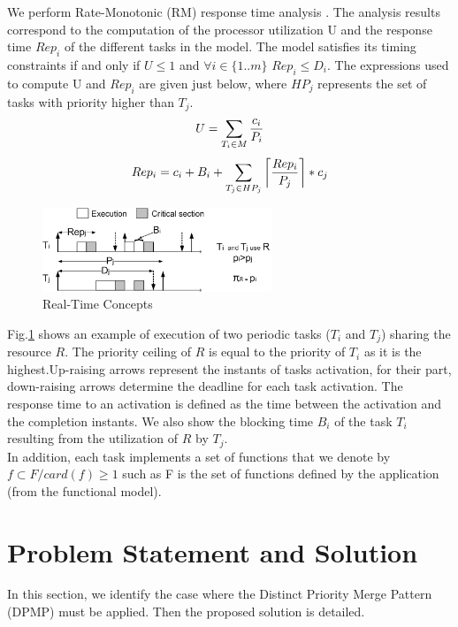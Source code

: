 \documentclass[runningheads,a4paper]{llncs}
\begin{document}
We perform Rate-Monotonic (RM) response time analysis \cite{RMA}. The analysis results correspond to the computation of the processor utilization U and the response time $Rep_i$ of the different tasks in the model. The model satisfies its timing constraints if and only if $U \leq 1$ and $\forall i \in \{1..m\}$ $Rep_i \leq D_i$. The expressions used to compute U and $Rep_i$ are given just below, where $HP_j$ represents the set of tasks with priority higher than $T_j$.
\begin{equation}
\footnotesize{U= \sum_{T_i \in M} \frac{c_i}{P_{i}}}
\label{eq:Utilization}
\end{equation}
\begin{equation}
\footnotesize{Rep_{i} = {c_i} + B_{i} + \sum_{T_j \in HP_j} \left\lceil \frac {Rep_{i}}{P_j} \right\rceil * {c_j} } 
\label{eq:responseTime}
\end{equation}
\begin{figure}[h]
\centering
\includegraphics[height=2.5cm]{Pic/RT}
\caption{Real-Time Concepts}
\label{RT}
\end{figure}
\vspace{-0.2cm}
Fig.\ref{RT} shows an example of execution of two periodic tasks ($T_i$ and $T_j$) sharing the resource $R$. The priority ceiling of $R$ is equal to the priority of $T_i$ as it is the highest.Up-raising arrows represent the instants of tasks activation, for their part, down-raising arrows determine the deadline for each task activation. The response time to an activation is defined as the time between the activation and the completion instants. We also show the blocking time $B_i$ of the task $T_i$ resulting from the utilization of $R$ by $T_j$.
\\In addition, each task implements a set of functions that we denote by $ f \subset F/ card (f) \geq 1$ such as F is the set of functions defined by the application (from the functional model). 

\section{Problem Statement and Solution}
In this section, we identify the case where the Distinct Priority Merge Pattern (DPMP) must be applied. Then the proposed solution is detailed. 
\end{document}
